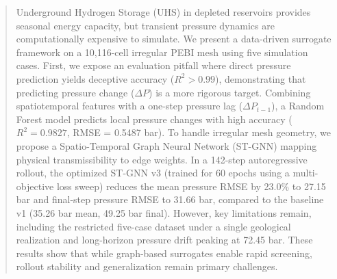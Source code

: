 \begin{abstract}
Underground Hydrogen Storage (UHS) in depleted reservoirs provides seasonal energy capacity, but transient pressure dynamics are computationally expensive to simulate. We present a data-driven surrogate framework on a 10,116-cell irregular PEBI mesh using five simulation cases. First, we expose an evaluation pitfall where direct pressure prediction yields deceptive accuracy ($R^2 > 0.99$), demonstrating that predicting pressure change ($\Delta P$) is a more rigorous target. Combining spatiotemporal features with a one-step pressure lag ($\Delta P_{t-1}$), a Random Forest model predicts local pressure changes with high accuracy ($R^2 = 0.9827$, RMSE = 0.5487 bar). To handle irregular mesh geometry, we propose a Spatio-Temporal Graph Neural Network (ST-GNN) mapping physical transmissibility to edge weights. In a 142-step autoregressive rollout, the optimized ST-GNN v3 (trained for 60 epochs using a multi-objective loss sweep) reduces the mean pressure RMSE by 23.0\% to 27.15 bar and final-step pressure RMSE to 31.66 bar, compared to the baseline v1 (35.26 bar mean, 49.25 bar final). However, key limitations remain, including the restricted five-case dataset under a single geological realization and long-horizon pressure drift peaking at 72.45 bar. These results show that while graph-based surrogates enable rapid screening, rollout stability and generalization remain primary challenges.
\end{abstract}
